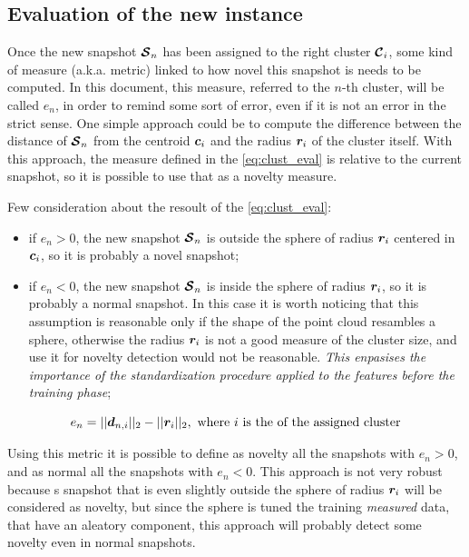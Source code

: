 \subsection{Evaluation of the new instance}
Once the new snapshot $\bm{\mathcal{S}}_n$ has been assigned to the right cluster $\bm{\mathcal{C}}_i$, some kind of measure (a.k.a. metric) linked to how novel this snapshot is needs to be computed. In this document, this measure, referred to the $n$-th cluster, will be called $e_n$, in order to remind some sort of error, even if it is not an error in the strict sense. One simple approach could be to compute the difference between the distance of $\bm{\mathcal{S}}_n$ from the centroid $\bm{c}_i$ and the radius $\bm{r}_i$ of the cluster itself. With this approach, the measure defined in the \autoref{eq:clust_eval} is relative to the current snapshot, so it is possible to use that as a novelty measure.

Few consideration about the resoult of the \autoref{eq:clust_eval}:
\begin{itemize}
  \item if $e_{n} > 0$, the new snapshot $\bm{\mathcal{S}}_n$ is outside the sphere of radius $\bm{r}_i$ centered in $\bm{c}_i$, so it is probably a novel snapshot;
  \item if $e_{n} < 0$, the new snapshot $\bm{\mathcal{S}}_n$ is inside the sphere of radius $\bm{r}_i$, so it is probably a normal snapshot. In this case it is worth noticing that this assumption is reasonable only if the shape of the point cloud resambles a sphere, otherwise the radius $\bm{r}_i$ is not a good measure of the cluster size, and use it for novelty detection would not be reasonable. \emph{This enpasises the importance of the standardization procedure applied to the features before the training phase};
\end{itemize}

\begin{equation}
  \label{eq:clust_eval}
  e_{n} = ||\bm{d}_{n,i}||_2 - ||\bm{r}_{i}||_2, \text{ where $i$ is the of the assigned cluster}
\end{equation}

Using this metric it is possible to define as novelty all the snapshots with $e_{n} > 0$, and as normal all the snapshots with $e_{n} < 0$. This approach is not very robust because s snapshot that is even slightly outside the sphere of radius $\bm{r}_i$ will be considered as novelty, but since the sphere is tuned the training \emph{measured} data, that have an aleatory component, this approach will probably detect some novelty even in normal snapshots.

